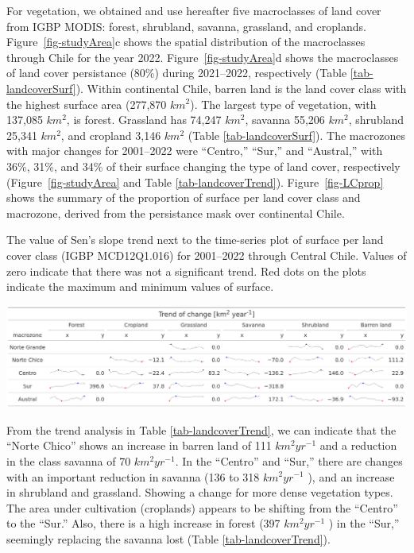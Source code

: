 \documentclass[
  authoryear,
  preprint,
  3p,
  onecolumn]{elsarticle}
\begin{document}
For vegetation, we obtained and use hereafter five macroclasses of land
cover from IGBP MODIS: forest, shrubland, savanna, grassland, and
croplands. Figure~\ref{fig-studyArea}c shows the spatial distribution of
the macroclasses through Chile for the year 2022.
Figure~\ref{fig-studyArea}d shows the macroclasses of land cover
persistance (80\%) during 2021--2022, respectively (Table
\ref{tab-landcoverSurf}). Within continental Chile, barren land is the
land cover class with the highest surface area (277,870 \(km^2\)). The
largest type of vegetation, with 137,085 \(km^2\), is forest. Grassland
has 74,247 \(km^2\), savanna 55,206 \(km^2\), shrubland 25,341 \(km^2\),
and cropland 3,146 \(km^2\) (Table \ref{tab-landcoverSurf}). The
macrozones with major changes for 2001--2022 were ``Centro,'' ``Sur,''
and ``Austral,'' with 36\%, 31\%, and 34\% of their surface changing the
type of land cover, respectively (Figure~\ref{fig-studyArea} and Table
\ref{tab-landcoverTrend}). Figure~\ref{fig-LCprop} shows the summary of
the proportion of surface per land cover class and macrozone, derived
from the persistance mask over continental Chile.

\begin{table}[!ht]
\caption{The value of Sen's slope trend next to the time-series plot of surface per land cover class (IGBP MCD12Q1.016) for 2001–2022 through Central Chile. Values of zero indicate that there was not a significant trend. Red dots on the plots indicate the maximum and minimum values of surface.}
\label{tab-landcoverTrend}
\includegraphics[]{../output/figs/table_var_landcover_macro.png}
\end{table}

From the trend analysis in Table \ref{tab-landcoverTrend}, we can
indicate that the ``Norte Chico'' shows an increase in barren land of
111 \(km^2 yr^{-1}\) and a reduction in the class savanna of 70
\(km^2 yr^{-1}\). In the ``Centro'' and ``Sur,'' there are changes with
an important reduction in savanna (136 to 318 \(km^2 yr^{-1}\) ), and an
increase in shrubland and grassland. Showing a change for more dense
vegetation types. The area under cultivation (croplands) appears to be
shifting from the ``Centro'' to the ``Sur.'' Also, there is a high
increase in forest (397 \(km^2 yr^{-1}\) ) in the ``Sur,'' seemingly
replacing the savanna lost (Table \ref{tab-landcoverTrend}).
\end{document}
